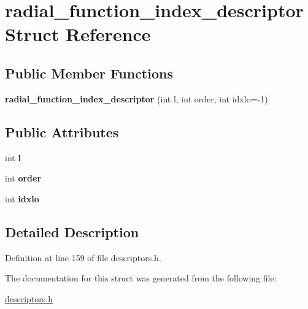 \hypertarget{structradial__function__index__descriptor}{}\section{radial\+\_\+function\+\_\+index\+\_\+descriptor Struct Reference}
\label{structradial__function__index__descriptor}
\subsection*{Public Member Functions}
\begin{DoxyCompactItemize}
\item 
\hypertarget{structradial__function__index__descriptor_aa193fad442597fac874d317d72d18295}{}{\bfseries radial\+\_\+function\+\_\+index\+\_\+descriptor} (int l, int order, int idxlo=-\/1)\label{structradial__function__index__descriptor_aa193fad442597fac874d317d72d18295}

\end{DoxyCompactItemize}
\subsection*{Public Attributes}
\begin{DoxyCompactItemize}
\item 
\hypertarget{structradial__function__index__descriptor_ae22c6ed7ec1b7ec2e1fae23e6e17ff6f}{}int {\bfseries l}\label{structradial__function__index__descriptor_ae22c6ed7ec1b7ec2e1fae23e6e17ff6f}

\item 
\hypertarget{structradial__function__index__descriptor_a7c6cb6a4a04acbc169e45c23f7778ab5}{}int {\bfseries order}\label{structradial__function__index__descriptor_a7c6cb6a4a04acbc169e45c23f7778ab5}

\item 
\hypertarget{structradial__function__index__descriptor_a13d75d3d3877a8eb67aa2f10ed0777e5}{}int {\bfseries idxlo}\label{structradial__function__index__descriptor_a13d75d3d3877a8eb67aa2f10ed0777e5}

\end{DoxyCompactItemize}


\subsection{Detailed Description}


Definition at line 159 of file descriptors.\+h.



The documentation for this struct was generated from the following file\+:\begin{DoxyCompactItemize}
\item 
\hyperlink{descriptors_8h}{descriptors.\+h}\end{DoxyCompactItemize}
